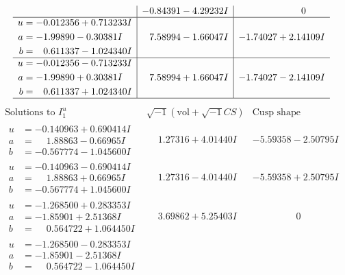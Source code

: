 \documentclass[1p]{elsarticle_modified}
\theoremstyle{definition}
\newcommand{\I}{\sqrt{-1}}
\begin{document}
$$\begin{array}{c|c|c}
 & -0.84391 - 4.29232 I & \phantom{-0.000000 } 0 \\ \hline\begin{aligned}
u &= -0.012356 + 0.713233 I \\
a &= -1.99890 - 0.30381 I \\
b &= \phantom{-}0.611337 - 1.024340 I\end{aligned}
 & \phantom{-}7.58994 - 1.66047 I & -1.74027 + 2.14109 I \\ \hline\begin{aligned}
u &= -0.012356 - 0.713233 I \\
a &= -1.99890 + 0.30381 I \\
b &= \phantom{-}0.611337 + 1.024340 I\end{aligned}
 & \phantom{-}7.58994 + 1.66047 I & -1.74027 - 2.14109 I\\
 \hline 
 \end{array}$$\newpage$$\begin{array}{c|c|c}  
\text{Solutions to }I^u_{1}& \I (\text{vol} + \sqrt{-1}CS) & \text{Cusp shape}\\
 \hline 
\begin{aligned}
u &= -0.140963 + 0.690414 I \\
a &= \phantom{-}1.88863 - 0.66965 I \\
b &= -0.567774 - 1.045600 I\end{aligned}
 & \phantom{-}1.27316 + 4.01440 I & -5.59358 - 2.50795 I \\ \hline\begin{aligned}
u &= -0.140963 - 0.690414 I \\
a &= \phantom{-}1.88863 + 0.66965 I \\
b &= -0.567774 + 1.045600 I\end{aligned}
 & \phantom{-}1.27316 - 4.01440 I & -5.59358 + 2.50795 I \\ \hline\begin{aligned}
u &= -1.268500 + 0.283353 I \\
a &= -1.85901 + 2.51368 I \\
b &= \phantom{-}0.564722 + 1.064450 I\end{aligned}
 & \phantom{-}3.69862 + 5.25403 I & \phantom{-0.000000 } 0 \\ \hline\begin{aligned}
u &= -1.268500 - 0.283353 I \\
a &= -1.85901 - 2.51368 I \\
b &= \phantom{-}0.564722 - 1.064450 I\end{aligned}

\end{array}$$
\end{document}
